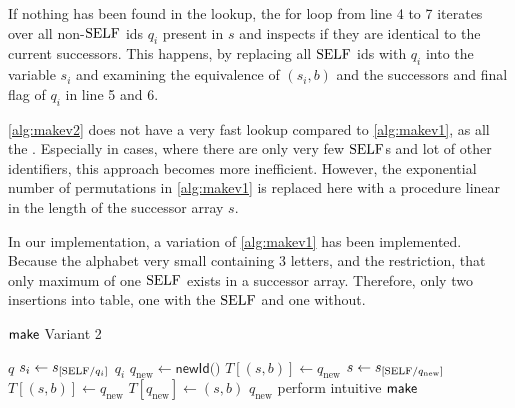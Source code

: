 If nothing has been found in the lookup, the for loop from line 4 to 7 iterates over all non-$\mathrm{SELF}$ ids $q_{i}$ present in $s$ and inspects if they are identical to the current successors. This happens, by replacing all $\mathrm{SELF}$ ids with $q_{i}$ into the variable $s_{i}$ and examining the equivalence of $(s_{i},b)$ and the successors and final flag of $q_{i}$ in line 5 and 6.
\par 
\autoref{alg:makev2} does not have a very fast lookup compared to \autoref{alg:makev1}, as all the . Especially in cases, where there are only very few $\mathrm{SELF}$s and lot of other identifiers, this approach becomes more inefficient. However, the exponential number of permutations in \autoref{alg:makev1} is replaced here with a procedure linear in the length of the successor array $s$.
\par 
In our implementation, a variation of \autoref{alg:makev1} has been implemented. Because the alphabet very small containing 3 letters, and the restriction, that only maximum of one $\mathrm{SELF}$ exists in a successor array. Therefore, only two insertions into table, one with the $\mathrm{SELF}$ and one without.

\begin{algorithm}[htb]
\caption{$\operatorname{\textsf{make}}$ Variant 2}\label{alg:makev2}
\begin{algorithmic}[1]
\Return $q$
\EndIf
{}
\State $s_{i} \gets s_{[\mathrm{SELF} / q_{i}]}$
\Return $q_{i}$
\EndIf
\EndFor
\State $q_{\text{new}} \gets \textsf{newId()}$
\State $T[(s,b)] \gets q_{\text{new}}$
\State $s \gets s_{[\mathrm{SELF} / q_{\text{new}}]}$
\State $T[(s,b)] \gets q_{\text{new}}$
\State $T[q_{\text{new}}] \gets (s,b)$
\Return $q_{\text{new}}$
\Else
\State perform intuitive $\operatorname{\textsf{make}}$
\EndIf
\end{algorithmic}
\end{algorithm}

